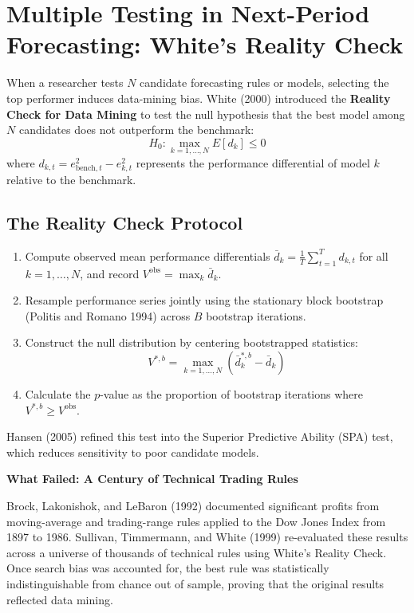 \section{Multiple Testing in Next-Period Forecasting: White's Reality Check}
\label{sec:05-reality}

When a researcher tests $N$ candidate forecasting rules or models, selecting the top performer induces data-mining bias. White (2000) introduced the \textbf{Reality Check for Data Mining} to test the null hypothesis that the best model among $N$ candidates does not outperform the benchmark:
\begin{equation}
  H_0: \max_{k=1, \dots, N} E[d_k] \le 0
  \label{eq:05-white-null}
\end{equation}
where $d_{k,t} = e^2_{\text{bench},t} - e^2_{k,t}$ represents the performance differential of model $k$ relative to the benchmark.

\subsection{The Reality Check Protocol}
\begin{enumerate}
  \item Compute observed mean performance differentials $\bar{d}_k = \frac{1}{T} \sum_{t=1}^T d_{k,t}$ for all $k = 1, \dots, N$, and record $V^{\text{obs}} = \max_k \bar{d}_k$.
  \item Resample performance series jointly using the stationary block bootstrap (Politis and Romano 1994) across $B$ bootstrap iterations.
  \item Construct the null distribution by centering bootstrapped statistics:
  \begin{equation}
    V^{*,b} = \max_{k=1, \dots, N} \left( \bar{d}_{k}^{*,b} - \bar{d}_k \right)
  \end{equation}
  \item Calculate the $p$-value as the proportion of bootstrap iterations where $V^{*,b} \ge V^{\text{obs}}$.
\end{enumerate}
Hansen (2005) refined this test into the Superior Predictive Ability (SPA) test, which reduces sensitivity to poor candidate models.

\begin{callout}
\noindent \textbf{What Failed: A Century of Technical Trading Rules}

Brock, Lakonishok, and LeBaron (1992) documented significant profits from moving-average and trading-range rules applied to the Dow Jones Index from 1897 to 1986. Sullivan, Timmermann, and White (1999) re-evaluated these results across a universe of thousands of technical rules using White's Reality Check. Once search bias was accounted for, the best rule was statistically indistinguishable from chance out of sample, proving that the original results reflected data mining.
\end{callout}

